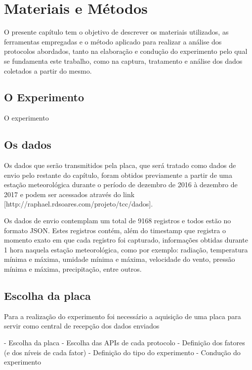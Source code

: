 \chapter{Materiais e Métodos}

O presente capítulo tem o objetivo de descrever os materiais utilizados, as ferramentas empregadas e o método aplicado para realizar a análise dos protocolos abordados, tanto na elaboração e condução do experimento pelo qual se fundamenta este trabalho, como na captura, tratamento e análise dos dados coletados a partir do mesmo.  

\section{O Experimento}

O experimento  

\section{Os dados}

Os dados que serão transmitidos pela placa, que será tratado como dados de envio pelo restante do capítulo, foram obtidos previamente a partir de uma estação meteorológica durante o período de dezembro de 2016 à dezembro de 2017 e podem ser acessados através do link [http://raphael.rdsoares.com/projeto/tcc/dados]. 

Os dados de envio contemplam um total de 9168 registros e todos estão no formato JSON. Estes registros contém, além do timestamp que registra o momento exato em que cada registro foi capturado, informações obtidas durante 1 hora naquela estação meteorológica, como por exemplo: radiação, temperatura mínima e máxima, umidade mínima e máxima, velocidade do vento, pressão mínima e máxima, precipitação, entre outros. 

\section{Escolha da placa}

Para a realização do experimento foi necessário a aquisição de uma placa para servir como central de recepção dos dados enviados 

- Escolha da placa
- Escolha das APIs de cada protocolo
- Definição dos fatores (e dos níveis de cada fator)
- Definição do tipo do experimento
- Condução do experimento
